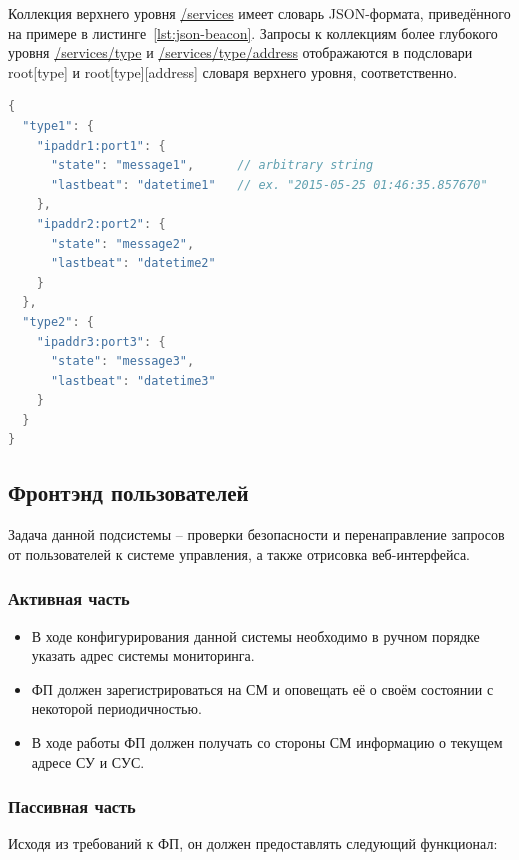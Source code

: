\documentclass[a4paper,12pt]{report}
\numberwithin{equation}{section}
\begin{document}
Коллекция верхнего уровня \url{/services} имеет словарь JSON-формата, приведённого на примере в листинге~\ref{lst:json-beacon}. Запросы к коллекциям более глубокого уровня \url{/services/type} и \url{/services/type/address} отображаются в подсловари root[type] и root[type][address] словаря верхнего уровня, соответственно.

\begin{lstlisting}[float={},language=Java,caption={Пример JSON-представления коллекции верхнего уровня сервиса мониторинга},label=lst:json-beacon]
{
  "type1": {
    "ipaddr1:port1": {
      "state": "message1", 		// arbitrary string
      "lastbeat": "datetime1"	// ex. "2015-05-25 01:46:35.857670"
    },
    "ipaddr2:port2": {
      "state": "message2",
      "lastbeat": "datetime2"
    }
  },
  "type2": {
    "ipaddr3:port3": {
      "state": "message3",
      "lastbeat": "datetime3"
    }
  }
}
\end{lstlisting}

\subsection{Фронтэнд пользователей}
Задача данной подсистемы -- проверки безопасности и перенаправление запросов от пользователей к системе управления, а также отрисовка веб-интерфейса.

\subsubsection{Активная часть}
\begin{itemize}
  \item В ходе конфигурирования данной системы необходимо в ручном порядке указать адрес системы мониторинга.
  \item ФП должен зарегистрироваться на СМ и оповещать её о своём состоянии с некоторой периодичностью.
  \item В ходе работы ФП должен получать со стороны СМ информацию о текущем адресе СУ и СУС.
\end{itemize}

\subsubsection{Пассивная часть}
Исходя из требований к ФП, он должен предоставлять следующий функционал:
\end{document}
